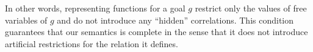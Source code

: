 \begin{comment}
\[
\forall {\mathfrak f}, {\mathfrak f'}:  \left.{\mathfrak f}\right|_{FV(g)} = \left.{\mathfrak f'}\right|_{FV(g)}, \quad {\mathfrak f} \in \sembr{g} \Leftrightarrow {\mathfrak f'} \in \sembr{g}
\]
\end{comment}

In other words, representing functions for a goal $g$ restrict only the values of free variables of $g$ and do not introduce any ``hidden'' correlations.
This condition guarantees that our semantics is complete in the sense that it does not introduce artificial restrictions for the relation it defines.

\begin{comment}
We prove that the semantics of goals always satisfies this condition:

The following lemma proves that the semantics of goals always satisfies this condition:

\begin{lstlisting}[language=Coq]
  Lemma completeness_condition (f f' : repr_fun) (g : goal),
    (forall x, is_fv_of_goal x g -> gt_eq (f x) (f' x)) ->
    [| g , f |] ->
    [| g , f' |].
\end{lstlisting}

Here ``\lstinline[language=Coq]{gt_eq}'' stands for the equality of ground terms.
\end{comment}
